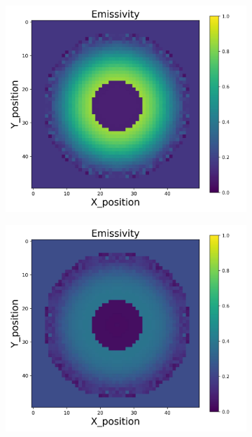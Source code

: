 \begin{figure}[p]
\begin{minipage}{\textwidth}
\begin{subfigure}{0.325\textwidth}
        \end{subfigure}
        \begin{subfigure}{0.325\textwidth}
            \centering
            \includegraphics[width=\textwidth]{figures/raw_data/23/lin_square/emi_cal.jpg}
        \end{subfigure}
        \begin{subfigure}{0.325\textwidth}
            \centering
            \includegraphics[width=\textwidth]{figures/raw_data/24/lin_square/emi_cal.jpg}

\end{subfigure}
\end{minipage}
\end{figure}
